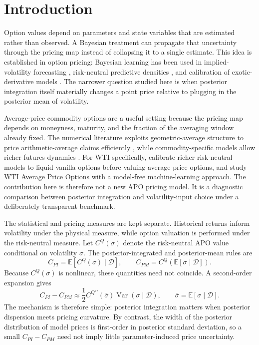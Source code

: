 \section{Introduction}\label{sec:introduction}

Option values depend on parameters and state variables that are estimated rather than observed. A Bayesian treatment can propagate that uncertainty through the pricing map instead of collapsing it to a single estimate. This idea is established in option pricing: Bayesian learning has been used in implied-volatility forecasting \cite{guidolin2003}, risk-neutral predictive densities \cite{romboutsstentoft2014}, and calibration of exotic-derivative models \cite{guptareisinger2014}. The narrower question studied here is when posterior integration itself materially changes a point price relative to plugging in the posterior mean of volatility.

Average-price commodity options are a useful setting because the pricing map depends on moneyness, maturity, and the fraction of the averaging window already fixed. The numerical literature exploits geometric-average structure to price arithmetic-average claims efficiently \cite{kemnavorst1990,curran1994}, while commodity-specific models allow richer futures dynamics \cite{schwartz1997,ewaldwu2023}. For WTI specifically, \cite{shirayatakahashi2011} calibrate richer risk-neutral models to liquid vanilla options before valuing average-price options, and \cite{ganwangyang2020} study WTI Average Price Options with a model-free machine-learning approach. The contribution here is therefore not a new APO pricing model. It is a diagnostic comparison between posterior integration and volatility-input choice under a deliberately transparent benchmark.

The statistical and pricing measures are kept separate. Historical returns inform volatility under the physical measure, while option valuation is performed under the risk-neutral measure. Let \(C^Q(\sigma)\) denote the risk-neutral APO value conditional on volatility \(\sigma\). The posterior-integrated and posterior-mean rules are
\begin{equation}
 C_{PI}=\mathbb E[C^Q(\sigma)\mid\mathcal D],
 \qquad
 C_{PM}=C^Q(\mathbb E[\sigma\mid\mathcal D]).
 \label{eq:intro_rules}
\end{equation}
Because \(C^Q(\sigma)\) is nonlinear, these quantities need not coincide. A second-order expansion gives
\begin{equation}
 C_{PI}-C_{PM}
 \approx
 \frac12 C^{Q\prime\prime}(\bar\sigma)
 \operatorname{Var}(\sigma\mid\mathcal D),
 \qquad
 \bar\sigma=\mathbb E[\sigma\mid\mathcal D].
 \label{eq:intro_taylor}
\end{equation}
The mechanism is therefore simple: posterior integration matters when posterior dispersion meets pricing curvature. By contrast, the width of the posterior distribution of model prices is first-order in posterior standard deviation, so a small \(C_{PI}-C_{PM}\) need not imply little parameter-induced price uncertainty.

